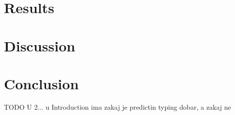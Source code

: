 \documentclass[twoside]{article}
\begin{document}
\begin{multicols}{2}
\section{Results}

\section{Discussion}

\section{Conclusion}
TODO U 2... u Introduction ima zakaj je predictin typing dobar, a zakaj ne


{}
\nocite{*}



\end{multicols}
\end{document}
